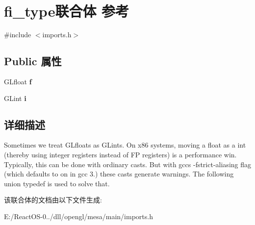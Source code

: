\hypertarget{unionfi__type}{}\section{fi\+\_\+type联合体 参考}
\label{unionfi__type}


{\ttfamily \#include $<$imports.\+h$>$}

\subsection*{Public 属性}
\begin{DoxyCompactItemize}
\item 
\mbox{\label{unionfi__type_a3b3dfd1df386d10c1fa125821756351d}} 
G\+Lfloat {\bfseries f}
\item 
\mbox{\label{unionfi__type_ae50f6e390586e3810ecfd879303f28b8}} 
G\+Lint {\bfseries i}
\end{DoxyCompactItemize}


\subsection{详细描述}
Sometimes we treat G\+Lfloats as G\+Lints. On x86 systems, moving a float as a int (thereby using integer registers instead of FP registers) is a performance win. Typically, this can be done with ordinary casts. But with gcc\textquotesingle{}s -\/fstrict-\/aliasing flag (which defaults to on in gcc 3.) these casts generate warnings. The following union typedef is used to solve that. 

该联合体的文档由以下文件生成\+:\begin{DoxyCompactItemize}
\item 
E\+:/\+React\+O\+S-\/0../dll/opengl/mesa/main/imports.\+h\end{DoxyCompactItemize}
